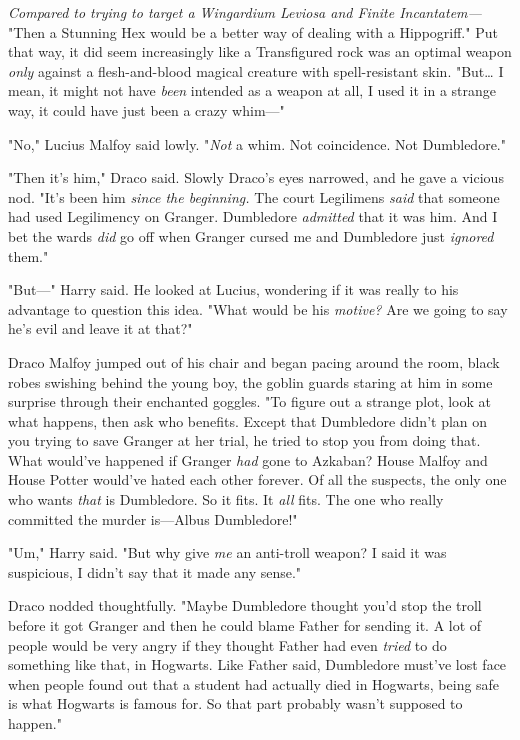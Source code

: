 \emph{Compared to trying to target a Wingardium Leviosa and Finite 
Incantatem---} "Then a Stunning Hex would be a better way of dealing with a 
Hippogriff." Put that way, it did seem increasingly like a Transfigured rock 
was an optimal weapon \emph{only} against a flesh-and-blood magical creature 
with spell-resistant skin. "But{\ldots} I mean, it might not have \emph{been} 
intended as a weapon at all, I used it in a strange way, it could have just 
been a crazy whim---"

"No," Lucius Malfoy said lowly. "\emph{Not} a whim. Not coincidence. Not 
Dumbledore."

"Then it's him," Draco said. Slowly Draco's eyes narrowed, and he gave a 
vicious nod. "It's been him \emph{since the beginning.} The court Legilimens 
\emph{said} that someone had used Legilimency on Granger. Dumbledore 
\emph{admitted} that it was him. And I bet the wards \emph{did} go off when 
Granger cursed me and Dumbledore just \emph{ignored} them."

"But---" Harry said. He looked at Lucius, wondering if it was really to his 
advantage to question this idea. "What would be his \emph{motive?} Are we going 
to say he's evil and leave it at that?"

Draco Malfoy jumped out of his chair and began pacing around the room, black 
robes swishing behind the young boy, the goblin guards staring at him in some 
surprise through their enchanted goggles. "To figure out a strange plot, look 
at what happens, then ask who benefits. Except that Dumbledore didn't plan on 
you trying to save Granger at her trial, he tried to stop you from doing that. 
What would've happened if Granger \emph{had} gone to Azkaban? House Malfoy and 
House Potter would've hated each other forever. Of all the suspects, the only 
one who wants \emph{that} is Dumbledore. So it fits. It \emph{all} fits. The 
one who really committed the murder is---Albus Dumbledore!"

"Um," Harry said. "But why give\emph{ me} an anti-troll weapon? I said it was 
suspicious, I didn't say that it made any sense."

Draco nodded thoughtfully. "Maybe Dumbledore thought you'd stop the troll 
before it got Granger and then he could blame Father for sending it. A lot of 
people would be very angry if they thought Father had even \emph{tried} to do 
something like that, in Hogwarts. Like Father said, Dumbledore must've lost 
face when people found out that a student had actually died in Hogwarts, being 
safe is what Hogwarts is famous for. So that part probably wasn't supposed to 
happen."

